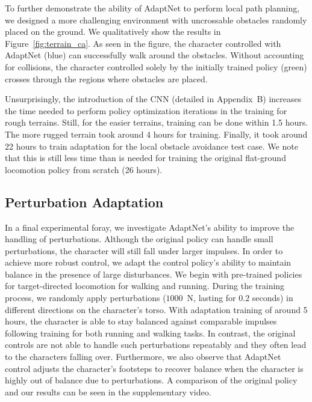 To further demonstrate the ability of AdaptNet to perform local path planning,
we designed a more challenging environment with uncrossable obstacles randomly placed on the ground.
We qualitatively show the results in Figure~\ref{fig:terrain_ca}.
As seen in the figure, the character controlled with AdaptNet (blue) can successfully %
walk around the obstacles.
Without accounting for collisions, the character controlled solely by the initially trained policy (green) crosses through the regions where obstacles are placed. 


Unsurprisingly, the introduction of the CNN (detailed in Appendix~B) increases the time needed to perform policy optimization iterations in the training for rough terrains.
Still, for the easier terrains, 
training can be done within 1.5 hours. %
The more rugged terrain took around 4 hours for training. 
Finally, it took around 22 hours to train adaptation 
for the local obstacle avoidance test case. 
We note that this is still less time than is needed 
for training the original flat-ground locomotion policy from scratch (26 hours). 




\subsection{Perturbation Adaptation}

In a final experimental foray, we investigate AdaptNet's ability to improve the handling of perturbations. Although the original policy can handle small perturbations, the character will still fall under larger impulses. In order to achieve more robust control, we adapt %
the control policy's ability to maintain balance in the presence of large disturbances. We begin with pre-trained policies for target-directed locomotion for walking and running. During the training process, we randomly apply perturbations ($1000$~N, lasting for  $0.2$ seconds) in different directions on the character's torso. With adaptation training of around 5 hours, the character is able to stay balanced against comparable impulses following training for both running and walking tasks.
In contrast, the original controls are not able to handle such perturbations repeatably and they often lead to the characters falling over. Furthermore,  we also observe that AdaptNet control adjusts the character's footsteps to recover balance when the character is highly out of balance due to perturbations.
A comparison of the original policy and our results can be seen in the supplementary video.


